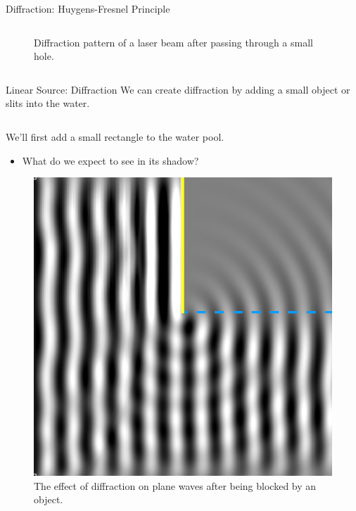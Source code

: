 \documentclass{beamer}
\begin{document}
\begin{frame}{Diffraction: Huygens-Fresnel Principle}
\begin{columns}[T]
\begin{column}{.45\textwidth}
\begin{figure}
               \caption{Diffraction pattern of a laser beam after passing through a small hole.}
               \label{fig:laserdiff}
           \end{figure}
         \end{column}
    \end{columns}
\end{frame}

\begin{frame}{Linear Source: Diffraction}
    We can create diffraction by adding a small object or slits into the water. \vspace{2mm}
    \begin{columns}[T]
        \begin{column}{.45\textwidth}
            We'll first add a small rectangle to the water pool.
            \begin{itemize}
                \item What do we expect to see in its shadow?
            \end{itemize}
            \begin{figure}
                \centering
                \includegraphics[scale=.2]{ripplediffobj.png}
                \caption{The effect of diffraction on plane waves after being blocked by an object.}
                \label{fig:planediffobject}
            \end{figure}

\end{column}
\end{columns}
\end{frame}
\end{document}
